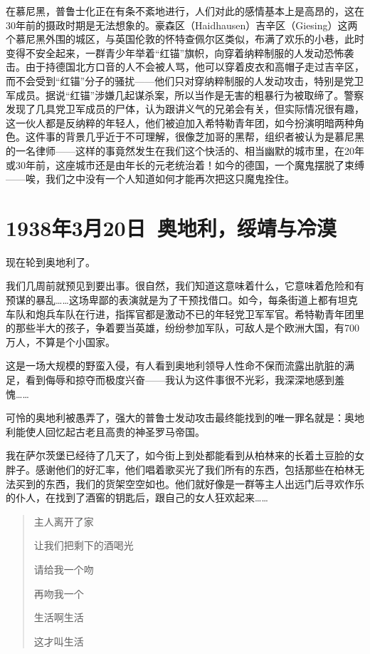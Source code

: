 \documentclass[UTF8]{ctexart}
\begin{document}
在慕尼黑，普鲁士化正在有条不紊地进行，人们对此的感情基本上是高昂的，这在30年前的摄政时期是无法想象的。豪森区（Haidhausen）吉辛区（Giesing）这两个慕尼黑外围的城区，与英国伦敦的怀特查佩尔区类似，布满了欢乐的小巷，此时变得不安全起来，一群青少年举着“红锚”旗帜，向穿着纳粹制服的人发动恐怖袭击。由于持德国北方口音的人不会被人骂，他可以穿着皮衣和高帽子走过吉辛区，而不会受到“红锚”分子的骚扰——他们只对穿纳粹制服的人发动攻击，特别是党卫军成员。据说“红锚”涉嫌几起谋杀案，所以当作是无害的粗暴行为被取缔了。警察发现了几具党卫军成员的尸体，认为跟讲义气的兄弟会有关，但实际情况很有趣，这一伙人都是反纳粹的年轻人，他们被迫加入希特勒青年团，如今扮演明暗两种角色。这件事的背景几乎近于不可理解，很像芝加哥的黑帮，组织者被认为是慕尼黑的一名律师——这样的事竟然发生在我们这个快活的、相当幽默的城市里，在20年或30年前，这座城市还是由年长的元老统治着！如今的德国，一个魔鬼摆脱了束缚——唉，我们之中没有一个人知道如何才能再次把这只魔鬼拴住。

\section{1938年3月20日\ 奥地利，绥靖与冷漠}

现在轮到奥地利了。

我们几周前就预见到要出事。很自然，我们知道这意味着什么，它意味着危险和有预谋的暴乱……这场卑鄙的表演就是为了干预找借口。如今，每条街道上都有坦克车队和炮兵车队在行进，指挥官都是激动不已的年轻党卫军军官。希特勒青年团里的那些半大的孩子，争着要当英雄，纷纷参加军队，可敌人是个欧洲大国，有700万人，不算是个小国家。

这是一场大规模的野蛮入侵，有人看到奥地利领导人性命不保而流露出肮脏的满足，看到侮辱和掠夺而极度兴奋——我认为这件事很不光彩，我深深地感到羞愧……

可怜的奥地利被愚弄了，强大的普鲁士发动攻击最终能找到的唯一罪名就是：奥地利能使人回忆起古老且高贵的神圣罗马帝国。

我在萨尔茨堡已经待了几天了，如今街上到处都能看到从柏林来的长着土豆脸的女胖子。感谢他们的好汇率，他们唱着歌买光了我们所有的东西，包括那些在柏林无法买到的东西，我们的货架空空如也。他们就好像是一群等主人出远门后寻欢作乐的仆人，在找到了酒窖的钥匙后，跟自己的女人狂欢起来……

\begin{verse}
主人离开了家

让我们把剩下的酒喝光

请给我一个吻

再吻我一个

生活啊生活

这才叫生活
\end{verse}
 
\end{document}
